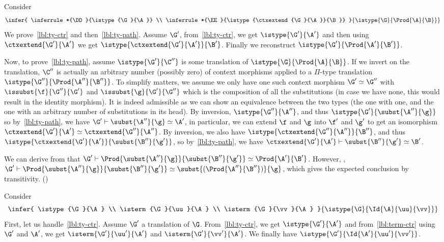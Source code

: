 

Consider
%
\begin{equation*}
  \infer{
    \inferrule*{\DD}{\istype{\G}{\A}} \\
    \inferrule*{\EE}{\istype{\ctxextend{\G}{\A}}{\B}}
  }
  {\istype{\G}{\Prod{\A}{\B}}}
\end{equation*}
%
We prove~\eqref{lbl:ty-ctr} and then~\eqref{lbl:ty-path}.
Assume $\G'$, from~\eqref{lbl:ty-ctr}, we get $\istype{\G'}{\A'}$ and then
using $\ctxextend{\G'}{\A'}$
we get $\istype{\ctxextend{\G'}{\A'}}{\B'}$.
Finally we reconstruct $\istype{\G'}{\Prod{\A'}{\B'}}$.

Now, to prove~\eqref{lbl:ty-path}, assume $\istype{\G'}{\C''}$
is some translation of $\istype{\G}{\Prod{\A}{\B}}$.
If we invert on the translation, $\C''$ is actually an arbitrary number
(possibly zero) of context morphisms applied to a $\Pi$-type translation
$\istype{\G''}{\Prod{\A''}{\B''}}$.
To simplify matters, we assume we only have one such context morphism
$\G' \simeq \G''$ with $\issubst{\f}{\G''}{\G'}$ and $\issubst{\g}{\G'}{\G''}$
which is the composition of all the substitutions (in case we have none, this
would result in the identity morphism). It is indeed admissible as we can show
an equivalence between the two types (the one with one, and the one with an
arbitrary number of substitutions in its head).
By inversion, $\istype{\G''}{\A''}$, and thus $\istype{\G'}{\subst{\A''}{\g}}$
so by~\eqref{lbl:ty-path}, we have $\G' \vdash \subst{\A''}{\g} \simeq \A'$,
in particular, we can extend $\f$ and $\g$ into $\f'$ and $\g'$ to get an
isomorphism $\ctxextend{\G'}{\A'} \simeq \ctxextend{\G''}{\A''}$.
By inversion, we also have $\istype{\ctxextend{\G''}{\A''}}{\B''}$,
and thus $\istype{\ctxextend{\G'}{\A'}}{\subst{\B''}{\g'}}$,
so by~\eqref{lbl:ty-path}, we have
$\ctxextend{\G'}{\A'} \vdash \subst{\B''}{\g'} \simeq \B'$.

We can derive from that
$\G' \vdash \Prod{\subst{\A''}{\g}}{\subst{\B''}{\g'}}
\simeq \Prod{\A'}{\B'}$.
However, ,
$\G' \vdash \Prod{\subst{\A''}{\g}}{\subst{\B''}{\g'}}
\simeq \subst{(\Prod{\A''}{\B''})}{\g}$,
which gives the expected conclusion by transitivity.
()


Consider
%
\begin{equation*}
  \infer{
    \istype{\G}{\A} \\
    \isterm{\G}{\uu}{\A} \\
    \isterm{\G}{\vv}{\A}
  }
  {\istype{\G}{\Id{\A}{\uu}{\vv}}}
\end{equation*}
%
First, let us handle~\eqref{lbl:ty-ctr}. Assume $\G'$ a translation of $\G$.
From~\eqref{lbl:ty-ctr}, we get $\istype{\G'}{\A'}$ and
from~\eqref{lbl:term-ctr} using $\G'$ and $\A'$, we get
$\isterm{\G'}{\uu'}{\A'}$ and $\isterm{\G'}{\vv'}{\A'}$.
We finally have $\istype{\G'}{\Id{\A'}{\uu'}{\vv'}}$.

